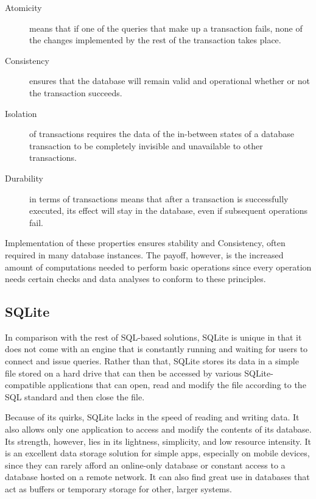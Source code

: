 \begin{description}
  \item[Atomicity] means that if one of the queries that make up a transaction fails, none of the changes implemented by the rest of the transaction takes place.
  \item[Consistency] ensures that the database will remain valid and operational whether or not the transaction succeeds.
  \item[Isolation] of transactions requires the data of the in-between states of a database transaction to be completely invisible and unavailable to other transactions.
  \item[Durability] in terms of transactions means that after a transaction is successfully executed, its effect will stay in the database, even if subsequent operations fail.
\end{description}
\par Implementation of these properties ensures stability and Consistency, often required in many database instances. The payoff, however, is the increased amount of computations needed to perform basic operations since every operation needs certain checks and data analyses to conform to these principles.

\subsection{SQLite}
\label{subsec:background:first_seciton:first_subsection}
\par In comparison with the rest of SQL-based solutions, SQLite is unique in that it does not come with an engine that is constantly running and waiting for users to connect and issue queries. Rather than that, SQLite stores its data in a simple file stored on a hard drive that can then be accessed by various SQLite-compatible applications that can open, read and modify the file according to the SQL standard and then close the file\citep{OwensSQLite}.
\par Because of its quirks, SQLite lacks in the speed of reading and writing data. It also allows only one application to access and modify the contents of its database. Its strength, however, lies in its lightness, simplicity, and low resource intensity. It is an excellent data storage solution for simple apps, especially on mobile devices, since they can rarely afford an online-only database or constant access to a database hosted on a remote network. It can also find great use in databases that act as buffers or temporary storage for other, larger systems\citep{OwensSQLite}.

